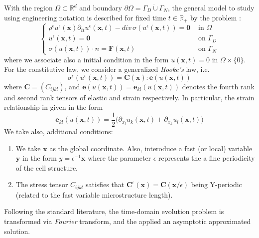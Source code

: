With the region $\Omega \subset \mathbb{R}^d$ and boundary $\partial \Omega = \Gamma_D \dot\cup \Gamma_N$, the general model to study using engineering notation is described for fixed time $t \in \mathbb{R}_+$ by the problem :
\begin{equation}
    \label{VectorPDE-Elasticity}
    \left \{
    \begin{array}{cc}
        \rho^{\epsilon}u^{\epsilon}(\mathbf{x}) \partial_{tt} u^{\epsilon}(\mathbf{x},t) - div \, \sigma(u^{\epsilon}(\mathbf{x},t)) = \mathbf{0} & \text{ in } \Omega \\
        u^{\epsilon}(\mathbf{x}, t) = \mathbf{0} & \text{ on } \Gamma_D\\
        \sigma(u(\mathbf{x},t)) \cdot n = \mathbf{F}(\mathbf{x},t) & \text{ on } \Gamma_N
    \end{array}
    \right .
\end{equation}
where we associate also a initial condition in the form $u(\mathbf{x}, t) = 0 \text{ in } \Omega \times \{0\}$. For the constitutive law, we consider a generalized \textit{Hooke's} law, i.e.
\begin{equation}
    \label{ConstituteEq}
    \sigma^{\epsilon}(u^{\epsilon}(\mathbf{x}, t)) = \mathbf{C}(\mathbf{x}) : \mathbf{e}(u(\mathbf{x},t)) 
\end{equation}
where $\mathbf{C} = (C_{ijkl})$, and $\mathbf{e}(u(\mathbf{x},t)) = \mathbf{e}_{kl}(u(\mathbf{x},t))$ denotes the fourth rank and second rank tensors of elastic and strain respectively. In particular, the strain relationship in given in the form
\begin{equation}
    \label{StrainEq}
    \mathbf{e}_{kl} (u(\mathbf{x},t)) = \frac{1}{2}\big( \partial_{x_l} u_k(\mathbf{x},t) + \partial_{x_k} u_l (\mathbf{x},t) \big)
\end{equation}
We take also, additional conditions:
\begin{enumerate}
    \item We take $\mathbf{x}$ as the global coordinate. Also, interoduce a fast (or local) variable $\mathbf{y}$ in the form $y = \epsilon^{-1}\mathbf{x}$ where the parameter $\epsilon$ represents the a fine periodicity of the cell structure.
    \item The stress tensor $C_{ijkl}$ satisfies that $\mathbf{C}^{\epsilon} (\mathbf{x}) = \mathbf{C}(\mathbf{x}/\epsilon)$ being Y-periodic (related to the fast variable microstructure length).
\end{enumerate}

Following the standard literature, the time-domain evolution problem is transformed via \textit{Fourier} transform, and the applied an asymptotic approximated solution.

